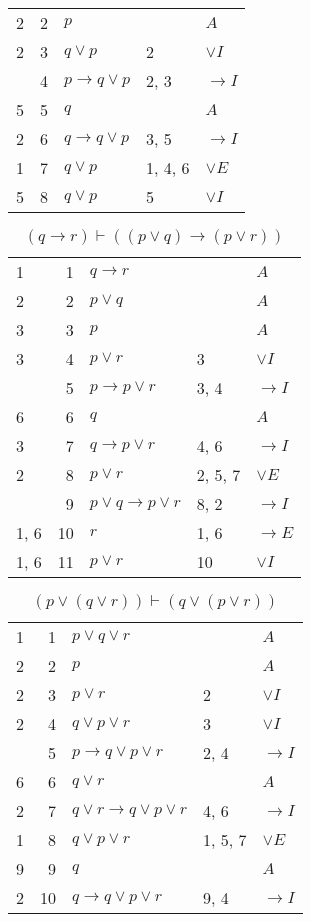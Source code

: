 \documentclass{article}
\begin{document}
\begin{table}[htbp]
\begin{tabular}{lrlll}
{2} & 2 & $p$ & {} & $A$ \\
{2} & 3 & $q∨p$ & {2} & $∨I$ \\
{} & 4 & $p→q∨p$ & {2, 3} & $→I$ \\
{5} & 5 & $q$ & {} & $A$ \\
{2} & 6 & $q→q∨p$ & {3, 5} & $→I$ \\
{1} & 7 & $q∨p$ & {1, 4, 6} & $∨E$ \\
{5} & 8 & $q∨p$ & {5} & $∨I$ \\
\end{tabular}
\end{table}\begin{table}[htbp]\caption*{$(q→r) ⊢ ((p∨q)→(p∨r))$}\centering\begin{tabular}{lrlll}
{1} & 1 & $q→r$ & {} & $A$ \\
{2} & 2 & $p∨q$ & {} & $A$ \\
{3} & 3 & $p$ & {} & $A$ \\
{3} & 4 & $p∨r$ & {3} & $∨I$ \\
{} & 5 & $p→p∨r$ & {3, 4} & $→I$ \\
{6} & 6 & $q$ & {} & $A$ \\
{3} & 7 & $q→p∨r$ & {4, 6} & $→I$ \\
{2} & 8 & $p∨r$ & {2, 5, 7} & $∨E$ \\
{} & 9 & $p∨q→p∨r$ & {8, 2} & $→I$ \\
{1, 6} & 10 & $r$ & {1, 6} & $→E$ \\
{1, 6} & 11 & $p∨r$ & {10} & $∨I$ \\
\end{tabular}
\end{table}\begin{table}[htbp]\caption*{$(p∨(q∨r)) ⊢ (q∨(p∨r))$}\centering\begin{tabular}{lrlll}
{1} & 1 & $p∨q∨r$ & {} & $A$ \\
{2} & 2 & $p$ & {} & $A$ \\
{2} & 3 & $p∨r$ & {2} & $∨I$ \\
{2} & 4 & $q∨p∨r$ & {3} & $∨I$ \\
{} & 5 & $p→q∨p∨r$ & {2, 4} & $→I$ \\
{6} & 6 & $q∨r$ & {} & $A$ \\
{2} & 7 & $q∨r→q∨p∨r$ & {4, 6} & $→I$ \\
{1} & 8 & $q∨p∨r$ & {1, 5, 7} & $∨E$ \\
{9} & 9 & $q$ & {} & $A$ \\
{2} & 10 & $q→q∨p∨r$ & {9, 4} & $→I$ \\

\end{tabular}
\end{table}
\end{document}
